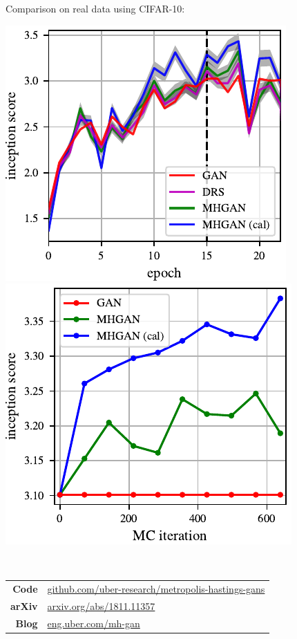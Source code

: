 \documentclass[a0,landscape]{a0poster}
\begin{document}
\begin{multicols}{3}
\begin{center}
\end{center}
Comparison on real data using CIFAR-10:
\begin{center}
\includegraphics[scale=2.5]{../figures/per_epoch.pdf}
\includegraphics[scale=2.5]{../figures/plot_per_mh.pdf}
\end{center}

~\\

\begin{center}
\begin{tabular}{rl}
\textbf{Code} &
\large {\url{github.com/uber-research/metropolis-hastings-gans}} \\
\textbf{arXiv} &
\large {\url{arxiv.org/abs/1811.11357}} \\
\textbf{Blog} &
\large {\url{eng.uber.com/mh-gan}}
\end{tabular}
\end{center}

\end{multicols}
\end{document}

